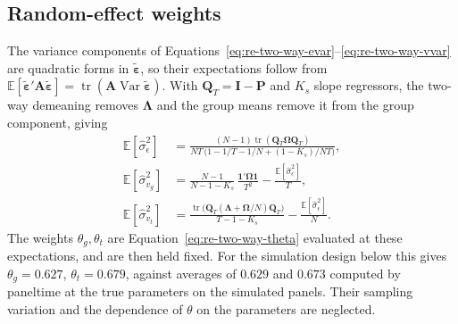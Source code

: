 \documentclass[12pt]{article}
\begin{document}
\subsection{Random-effect weights}\label{sec:expected-theta}
The variance components of Equations~\ref{eq:re-two-way-evar}--\ref{eq:re-two-way-vvar} are quadratic forms in $\tilde{\boldsymbol\varepsilon}$, so their expectations follow from $\mathbb E[\tilde{\boldsymbol\varepsilon}'\mathbf A\tilde{\boldsymbol\varepsilon}]=\operatorname{tr}(\mathbf A\operatorname{Var}\tilde{\boldsymbol\varepsilon})$. With $\mathbf Q_T=\mathbf I-\mathbf P$ and $K_s$ slope regressors, the two-way demeaning removes $\boldsymbol\Lambda$ and the group means remove it from the group component, giving
\begin{align}
\mathbb E[\widehat\sigma_\epsilon^2]&=\frac{(N-1)\operatorname{tr}(\mathbf Q_T\boldsymbol\Omega\mathbf Q_T)}{NT\,\big(1-1/T-1/N+(1-K_s)/NT\big)},\\
\mathbb E[\widehat\sigma_{v_g}^2]&=\frac{N-1}{N-1-K_s}\,\frac{\mathbf 1'\boldsymbol\Omega\mathbf 1}{T^2}-\frac{\mathbb E[\widehat\sigma_\epsilon^2]}T,\\
\mathbb E[\widehat\sigma_{v_t}^2]&=\frac{\operatorname{tr}\!\big(\mathbf Q_T(\boldsymbol\Lambda+\boldsymbol\Omega/N)\mathbf Q_T\big)}{T-1-K_s}-\frac{\mathbb E[\widehat\sigma_\epsilon^2]}N.
\end{align}
The weights $\theta_g,\theta_t$ are Equation~\ref{eq:re-two-way-theta} evaluated at these expectations, and are then held fixed. For the simulation design below this gives $\theta_g=0.627$, $\theta_t=0.679$, against averages of $0.629$ and $0.673$ computed by paneltime at the true parameters on the simulated panels. Their sampling variation and the dependence of $\theta$ on the parameters are neglected.
\end{document}
